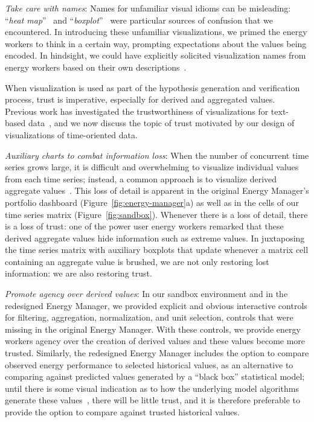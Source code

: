 \documentclass[journal]{vgtc}                %
\newcommand{\bstart}[1]{\vspace{1mm} \noindent{\textbf{#1:}}}
\newcommand{\jn}[1]{\textcolor{darkGreen}{#1}}
\begin{document}

{\it Take care with names}: Names for unfamiliar visual idioms can be misleading: ``{\it heat map}''~\cite{Field2015,Wilkinson2009} and ``{\it boxplot}''~\cite{Wickham2011} were particular sources of confusion that we encountered.
In introducing these unfamiliar visualizations, we primed the energy workers to think in a certain way, prompting expectations about the values being encoded. 
In hindsight, we could have explicitly solicited visualization names from energy workers based on their own descriptions~\cite{Metoyer2012}.

\bstart{Trust} When visualization is used as part of the hypothesis generation and verification process, trust is imperative, especially for derived and aggregated values. %
Previous work has investigated the trustworthiness of visualizations for text-based data~\cite{Chuang2012}, and we now discuss the topic of trust motivated by our design of visualizations of time-oriented data.

{\it Auxiliary charts to combat information loss}: When the number of concurrent time series grows large, it is difficult and overwhelming to visualize individual values from each time series; instead, a common approach is to visualize derived aggregate values~\cite{McLachlan2008}.
This loss of detail is apparent in the original Energy Manager's portfolio dashboard (Figure~\ref{fig:energy-manager}a) as well as in the cells of our time series matrix (Figure~\ref{fig:sandbox}).
Whenever there is a loss of detail, there is a loss of trust: one of the power user energy workers remarked that these derived aggregate values hide information such as extreme values.
In juxtaposing the time series matrix with auxiliary boxplots that update whenever a matrix cell containing an aggregate value is brushed, we are not only restoring lost information: we are also restoring trust.

{\it Promote agency over derived values}: In our sandbox environment and in the redesigned Energy Manager, we provided explicit and obvious interactive controls for filtering, aggregation, normalization, and unit selection, controls that were missing in the original Energy Manager.
With these controls, we provide energy workers agency over the creation of derived values and these values become more trusted.
Similarly, the redesigned Energy Manager includes the option to compare observed energy performance to selected historical values, as an alternative to comparing against predicted values generated by a ``black box'' statistical model; until there is some visual indication as to how the underlying model algorithms generate these values~\cite{Muhlbacher2014}, there will be little trust, and it is therefore preferable to provide the option to compare against trusted historical values.
\end{document}
